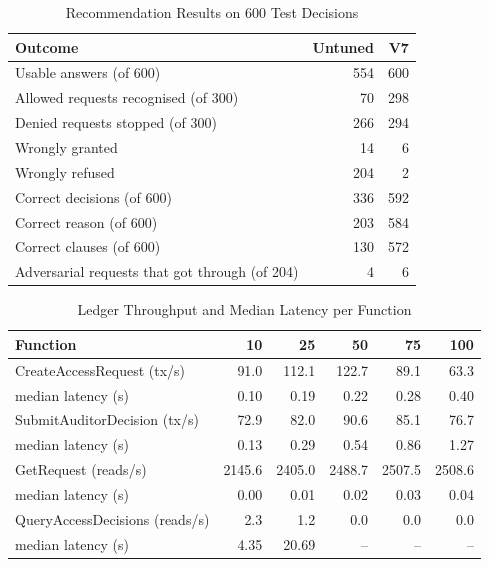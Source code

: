\begin{table}[tb]
\centering
\caption{Recommendation Results on 600 Test Decisions}
\label{tab:tb-quality}
\footnotesize
\begin{tabular}{@{}lrr@{}}
\toprule
Outcome & Untuned & V7 \\
\midrule
Usable answers (of 600) & 554 & 600 \\
Allowed requests recognised (of 300) & 70 & 298 \\
Denied requests stopped (of 300) & 266 & 294 \\
Wrongly granted & 14 & 6 \\
Wrongly refused & 204 & 2 \\
Correct decisions (of 600) & 336 & 592 \\
Correct reason (of 600) & 203 & 584 \\
Correct clauses (of 600) & 130 & 572 \\
Adversarial requests that got through (of 204) & 4 & 6 \\
\bottomrule
\end{tabular}
\end{table}

\begin{table}[tb]
\centering
\caption{Ledger Throughput and Median Latency per Function}
\label{tab:tb-ledger}
\footnotesize
\setlength{\tabcolsep}{3pt}
\begin{tabular}{@{}lrrrrr@{}}
\toprule
Function & 10 & 25 & 50 & 75 & 100 \\
\midrule
CreateAccessRequest (tx/s) & 91.0 & 112.1 & 122.7 & 89.1 & 63.3 \\
\quad median latency (s) & 0.10 & 0.19 & 0.22 & 0.28 & 0.40 \\
SubmitAuditorDecision (tx/s) & 72.9 & 82.0 & 90.6 & 85.1 & 76.7 \\
\quad median latency (s) & 0.13 & 0.29 & 0.54 & 0.86 & 1.27 \\
GetRequest (reads/s) & 2145.6 & 2405.0 & 2488.7 & 2507.5 & 2508.6 \\
\quad median latency (s) & 0.00 & 0.01 & 0.02 & 0.03 & 0.04 \\
QueryAccessDecisions (reads/s) & 2.3 & 1.2 & 0.0 & 0.0 & 0.0 \\
\quad median latency (s) & 4.35 & 20.69 & -- & -- & -- \\
\bottomrule
\end{tabular}
\end{table}

